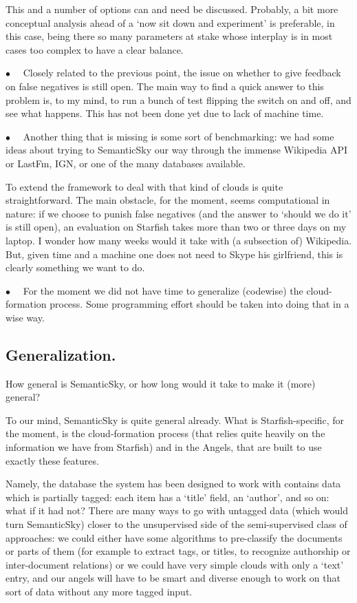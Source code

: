 \documentclass[11pt]{article}
\begin{document}
This and a number of options can and need be discussed. Probably, a bit more conceptual analysis ahead of a `now sit down and experiment' is preferable, in this case, being there so many parameters at stake whose interplay is in most cases too complex to have a clear balance.

$\bullet \quad$ Closely related to the previous point, the issue on whether to give feedback on false negatives is still open. The main way to find a quick answer to this problem is, to my mind, to run a bunch of test flipping the switch on and off, and see what happens. This has not been done yet due to lack of machine time.

$\bullet \quad$ Another thing that is missing is some sort of benchmarking: we had some ideas about trying to SemanticSky our way through the immense Wikipedia API or LastFm, IGN, or one of the many databases available.

To extend the framework to deal with that kind of clouds is quite straightforward. The main obstacle, for the moment, seems computational in nature: if we choose to punish false negatives (and the answer to `should we do it' is still open), an evaluation on Starfish takes more than two or three days on my laptop. I wonder how many weeks would it take with (a subsection of) Wikipedia. But, given time and a machine one does not need to Skype his girlfriend, this is clearly something we want to do.

$\bullet \quad$ For the moment we did not have time to generalize (codewise) the cloud-formation process. Some programming effort should be taken into doing that in a wise way.

\subsection{Generalization.}

How general is SemanticSky, or how long would it take to make it (more) general?

To our mind, SemanticSky is quite general already. What is Starfish-specific, for the moment, is the cloud-formation process (that relies quite heavily on the information we have from Starfish) and in the Angels, that are built to use exactly these features.

Namely, the database the system has been designed to work with contains data which is partially tagged: each item has a `title' field, an `author', and so on: what if it had not?
There are many ways to go with untagged data (which would turn SemanticSky) closer to the unsupervised side of the semi-supervised class of approaches: we could either have some algorithms to pre-classify the documents or parts of them (for example to extract tags, or titles, to recognize authorship or inter-document relations) or we could have very simple clouds with only a `text' entry, and our angels will have to be smart and diverse enough to work on that sort of data without any more tagged input.
\end{document}
